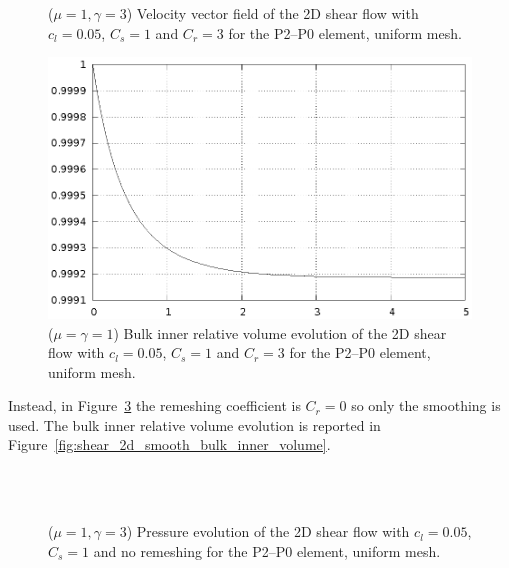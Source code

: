 \documentclass[a4paper,12pt,onecolumn]{article}
\begin{document}
\begin{figure}[htbp]
  \centering
  \quad
  \\
  \quad
  \\
  \caption{($\mu=1,\gamma=3$) Velocity vector field of the 2D shear flow with
$c_l=0.05$, $C_s=1$ and $C_r=3$ for the P2--P0 element, uniform mesh.}
  \label{fig:shear_2d_velocity}
\end{figure}

\begin{figure}[htbp]
  \centering
  \includegraphics[width=.45\textwidth]{figures/2d_shear_bulk_inner_volume.ps}
  \caption{($\mu=\gamma=1$) Bulk inner relative volume evolution of the 2D
shear flow with $c_l=0.05$, $C_s=1$ and $C_r=3$ for the P2--P0 element, uniform
mesh.}
  \label{fig:shear_2d_bulk_inner_volume}
\end{figure}

Instead, in Figure~\ref{fig:shear_2d_smooth} the remeshing coefficient is
$C_r=0$ so only the smoothing is used. The bulk inner relative volume evolution
is reported in Figure~\ref{fig:shear_2d_smooth_bulk_inner_volume}.
\begin{figure}[htbp]
  \centering
  \quad
  \\
  \quad
  \\
  \caption{($\mu=1,\gamma=3$) Pressure evolution of the 2D shear flow with
$c_l=0.05$, $C_s=1$ and no remeshing for the P2--P0 element, uniform mesh.}
  \label{fig:shear_2d_smooth}
\end{figure}
\end{document}
